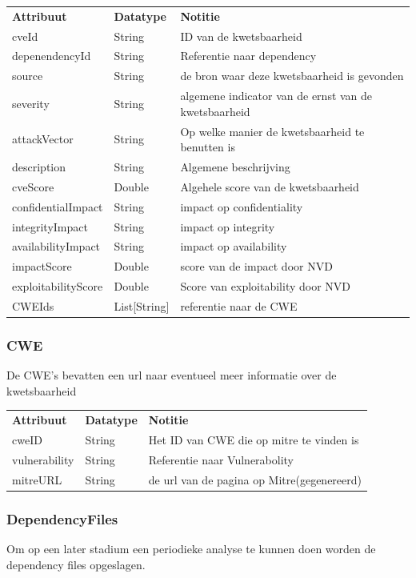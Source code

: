 \begin{tabular}{lll}
    \textbf{Attribuut} & \textbf{Datatype} & \textbf{Notitie}\\
    cveId & String & ID van de kwetsbaarheid\\
    depenendencyId & String & Referentie naar dependency\\
    source & String & de bron waar deze kwetsbaarheid is gevonden\\
    severity & String & algemene indicator van de ernst van de kwetsbaarheid \\
    attackVector & String & Op welke manier de kwetsbaarheid te benutten is\\
    description & String & Algemene beschrijving\\
    cveScore & Double & Algehele score van de kwetsbaarheid\\
    confidentialImpact & String & impact op confidentiality\\
    integrityImpact & String & impact op integrity \\
    availabilityImpact & String &  impact op availability  \\
    impactScore & Double & score van de impact door NVD  \\
    exploitabilityScore & Double & Score van exploitability door NVD  \\
    CWEIds & List[String] & referentie naar de CWE \\
\end{tabular}

\subsubsection{CWE}\label{subsubsec:cwe}
De CWE's bevatten een url naar eventueel meer informatie over de kwetsbaarheid

\begin{tabular}{lll}
    \textbf{Attribuut} & \textbf{Datatype} & \textbf{Notitie}\\
    cweID & String & Het ID van CWE die op mitre te vinden is\\
    vulnerability & String  & Referentie naar Vulnerabolity \\
    mitreURL & String & de url van de pagina op Mitre(gegenereerd)\\
\end{tabular}

\subsubsection{DependencyFiles}\label{subsubsec:dependencyFiles}
Om op een later stadium een periodieke analyse te kunnen doen worden de dependency files opgeslagen.

